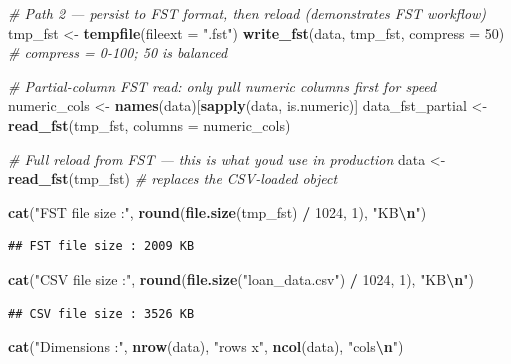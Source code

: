 \documentclass[
]{article}
\newenvironment{Shaded}{\begin{snugshade}}{\end{snugshade}}
\newcommand{\AttributeTok}[1]{\textcolor[rgb]{0.13,0.29,0.53}{#1}}
\newcommand{\CommentTok}[1]{\textcolor[rgb]{0.56,0.35,0.01}{\textit{#1}}}
\newcommand{\DecValTok}[1]{\textcolor[rgb]{0.00,0.00,0.81}{#1}}
\newcommand{\FunctionTok}[1]{\textcolor[rgb]{0.13,0.29,0.53}{\textbf{#1}}}
\newcommand{\NormalTok}[1]{#1}
\newcommand{\OtherTok}[1]{\textcolor[rgb]{0.56,0.35,0.01}{#1}}
\newcommand{\SpecialCharTok}[1]{\textcolor[rgb]{0.81,0.36,0.00}{\textbf{#1}}}
\newcommand{\StringTok}[1]{\textcolor[rgb]{0.31,0.60,0.02}{#1}}
\begin{document}
\begin{Shaded}
\begin{Highlighting}[]
\CommentTok{\# Path 2 — persist to FST format, then reload (demonstrates FST workflow)}
\NormalTok{tmp\_fst }\OtherTok{\textless{}{-}} \FunctionTok{tempfile}\NormalTok{(}\AttributeTok{fileext =} \StringTok{".fst"}\NormalTok{)}
\FunctionTok{write\_fst}\NormalTok{(data, tmp\_fst, }\AttributeTok{compress =} \DecValTok{50}\NormalTok{)   }\CommentTok{\# compress = 0{-}100; 50 is balanced}

\CommentTok{\# Partial{-}column FST read: only pull numeric columns first for speed}
\NormalTok{numeric\_cols }\OtherTok{\textless{}{-}} \FunctionTok{names}\NormalTok{(data)[}\FunctionTok{sapply}\NormalTok{(data, is.numeric)]}
\NormalTok{data\_fst\_partial }\OtherTok{\textless{}{-}} \FunctionTok{read\_fst}\NormalTok{(tmp\_fst, }\AttributeTok{columns =}\NormalTok{ numeric\_cols)}

\CommentTok{\# Full reload from FST — this is what you\textquotesingle{}d use in production}
\NormalTok{data }\OtherTok{\textless{}{-}} \FunctionTok{read\_fst}\NormalTok{(tmp\_fst)   }\CommentTok{\# replaces the CSV{-}loaded object}

\FunctionTok{cat}\NormalTok{(}\StringTok{"FST file size :"}\NormalTok{, }\FunctionTok{round}\NormalTok{(}\FunctionTok{file.size}\NormalTok{(tmp\_fst) }\SpecialCharTok{/} \DecValTok{1024}\NormalTok{, }\DecValTok{1}\NormalTok{), }\StringTok{"KB}\SpecialCharTok{\textbackslash{}n}\StringTok{"}\NormalTok{)}
\end{Highlighting}
\end{Shaded}

\begin{verbatim}
## FST file size : 2009 KB
\end{verbatim}

\begin{Shaded}
\begin{Highlighting}[]
\FunctionTok{cat}\NormalTok{(}\StringTok{"CSV file size :"}\NormalTok{, }\FunctionTok{round}\NormalTok{(}\FunctionTok{file.size}\NormalTok{(}\StringTok{"loan\_data.csv"}\NormalTok{) }\SpecialCharTok{/} \DecValTok{1024}\NormalTok{, }\DecValTok{1}\NormalTok{), }\StringTok{"KB}\SpecialCharTok{\textbackslash{}n}\StringTok{"}\NormalTok{)}
\end{Highlighting}
\end{Shaded}

\begin{verbatim}
## CSV file size : 3526 KB
\end{verbatim}

\begin{Shaded}
\begin{Highlighting}[]
\FunctionTok{cat}\NormalTok{(}\StringTok{"Dimensions    :"}\NormalTok{, }\FunctionTok{nrow}\NormalTok{(data), }\StringTok{"rows x"}\NormalTok{, }\FunctionTok{ncol}\NormalTok{(data), }\StringTok{"cols}\SpecialCharTok{\textbackslash{}n}\StringTok{"}\NormalTok{)}
\end{Highlighting}
\end{Shaded}
\end{document}
